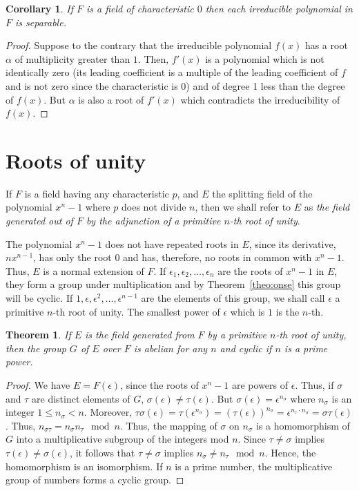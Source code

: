 \documentclass[10pt,leqno,a5paper]{book}
\newtheorem{theo}{Theorem}
\newtheorem*{coro*}{Corollary}
\theoremstyle{definition}
\let\htw\section
\begin{document}
\begin{coro*}
If $F$ is a field of characteristic $0$ then each irreducible polynomial in $F$ is separable.
\end{coro*}

\begin{proof}
Suppose to the contrary that the irreducible polynomial $f(x)$ has a root $\alpha$ of multiplicity greater than $1$.
Then, $f'(x)$ is a polynomial which is not identically zero (its leading coefficient is a multiple of the leading coefficient of $f$ and is not zero since the characteristic is $0$) and of degree 1 less than the degree of $f(x)$.
But $\alpha$ is also a root of $f'(x)$ which contradicts the irreducibility of $f(x)$.
\end{proof}


\htw{Roots of unity}

If $F$ is a field having any characteristic $p$, and $E$ the splitting field of the polynomial $x^n - 1$ where $p$ does not divide $n$, then we shall refer to $E$ as \emph{the field generated out of $F$ by the adjunction of a primitive $n$-th root of unity}.

The polynomial $x^n - 1$ does not have repeated roots in $E$, since its derivative, $n x^{n-1}$, has only the root $0$ and has, therefore, no roots in common with $x^n - 1$.
Thus, $E$ is a normal extension of $F$.
If $\epsilon_1, \epsilon_2, \ldots, \epsilon_n$ are the roots of $x^n - 1$ in $E$, they form a group under multiplication and by Theorem~\ref{theo:onse} this group will be cyclic.
If $1, \epsilon, \epsilon^2, \ldots, \epsilon^{n-1}$ are the elements of this group, we shall call $\epsilon$ a primitive $n$-th root of unity.
The smallest power of $\epsilon$ which is $1$ is the $n$-th.


\begin{theo}
\label{theo:twze}
If $E$ is the field generated from $F$ by a primitive $n$-th root of unity, then the group $G$ of $E$ over $F$ is abelian for any $n$ and cyclic if $n$ is a prime power.
\end{theo}


\begin{proof}
We have $E = F(\epsilon)$, since the roots of $x^n - 1$ are powers of $\epsilon$.
Thus, if $\sigma$ and $\tau$ are distinct elements of $G$, $\sigma(\epsilon) \not= \tau(\epsilon)$.
But $\sigma(\epsilon) = \epsilon^{n_\sigma}$ where $n_\sigma$ is an integer $1 \leq n_\sigma < n$.
Moreover, $\tau \sigma(\epsilon) = \tau(\epsilon^{n_\sigma}) = (\tau(\epsilon))^{n_\sigma} = \epsilon^{n_\tau \cdot n_\sigma} = \sigma \tau(\epsilon)$.
Thus, $n_{\sigma\tau} = n_\sigma n_\tau \mod n$.
Thus, the mapping of $\sigma$ on $n_\sigma$ is a homomorphism of $G$ into a multiplicative subgroup of the integers mod $n$.
Since $\tau \not= \sigma$ implies $\tau(\epsilon) \not= \sigma(\epsilon)$, it follows that $\tau \not= \sigma$ implies $n_{\sigma} \not= n_\tau \mod n$.
Hence, the homomorphism is an isomorphism.
If $n$ is a prime number, the multiplicative group of numbers forms a cyclic group.
\end{proof}
\end{document}
